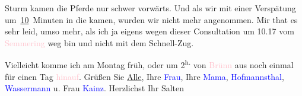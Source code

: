                Sturm kamen die Pferde nur schwer vorwärts. Und als wir mit einer Verspätung um \uline{10} Minuten in die \label{K_L03492-2v}\label{K_L03492-2h} kamen, wurden wir nicht mehr angenommen. Mir that es sehr
               leid, umso mehr, als ich ja eigens wegen dieser Consultation um 10.17
               vom \textcolor{pink}{Semmering}{}\ledrightnote{\textcolor{pink}{Semmering}} weg bin und nicht mit dem
               Schnell-Zug.\pend
           
\pstart
           Vielleicht komme ich am Montag{ }früh, oder um 2\textsuperscript{h.} von \textcolor{pink}{Brünn}{}\ledrightnote{\textcolor{pink}{Brünn}} aus noch einmal für einen Tag
                  \textcolor{pink}{hinauf}{}\ledrightnote{{$\rightarrow$}\textcolor{pink}{Semmering}}. Grüßen Sie \uline{Alle}, Ihre \textcolor{blue}{Frau}{}\ledrightnote{{$\rightarrow$}\textcolor{blue}{Olga Schnitzler}}, Ihre \textcolor{blue}{Mama}{}\ledrightnote{{$\rightarrow$}\textcolor{blue}{Louise Schnitzler}}, \textcolor{blue}{Hofmannsthal}{}\ledrightnote{\textcolor{blue}{Hugo von Hofmannsthal}},
                  \textcolor{blue}{Wassermann}{}\ledrightnote{\textcolor{blue}{Jakob Wassermann}} u. Frau \textcolor{blue}{Kainz}{}\ledrightnote{\textcolor{blue}{Margarethe Kainz}}. Herzlichst Ihr \spacefill\mbox{Salten}\pend
           \endnumbering{}  
      
